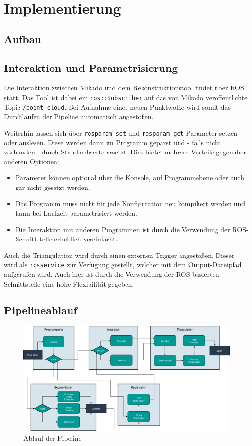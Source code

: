 
\chapter{Implementierung}
\label{ch:implementierung}

\section{Aufbau}
\label{sec:aufbau}


\section{Interaktion und Parametrisierung}
\label{sec:interaktion}

Die Interaktion zwischen Mikado und dem Rekonstruktionstool findet über \ac{ROS} statt.
Das Tool ist dabei ein \texttt{ros::Subscriber} auf das von Mikado veröffentlichte Topic \texttt{/point\_cloud}.
Bei Aufnahme einer neuen Punktwolke wird somit das Durchlaufen der Pipeline automatisch angestoßen.

Weiterhin lassen sich über \texttt{rosparam set} und \texttt{rosparam get} Parameter setzen oder auslesen.
Diese werden dann im Programm geparst und - falls nicht vorhanden - durch Standardwerte ersetzt.
Dies bietet mehrere Vorteile gegenüber anderen Optionen:

\begin{itemize}
\item Parameter können optional über die Konsole, auf Programmebene oder auch gar nicht gesetzt werden.
\item Das Programm muss nicht für jede Konfiguration neu kompiliert werden und kann bei Laufzeit parametrisiert werden.
\item Die Interaktion mit anderen Programmen ist durch die Verwendung der \ac{ROS}-Schnittstelle erheblich vereinfacht.
\end{itemize}

Auch die Triangulation wird durch einen externen Trigger angestoßen.
Dieser wird als \texttt{rosservice} zur Verfügung gestellt, welcher mit dem Output-Dateipfad aufgerufen wird.
Auch hier ist durch die Verwendung der \ac{ROS}-basierten Schnittstelle eine hohe Flexibilität gegeben.


\section{Pipelineablauf}

\label{sec:pipeline}

\begin{figure}[ht]
    \centering
	\includegraphics[width=\textwidth]{images/pipeline.png}
	\caption{Ablauf der Pipeline}
	\label{fig:pipeline}
\end{figure}

